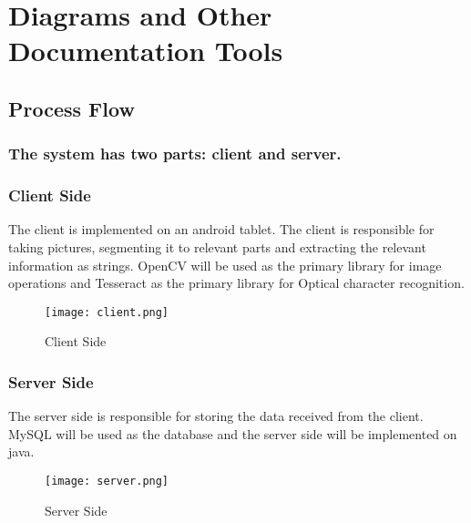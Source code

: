 %
%
%                 

\chapter{Diagrams and Other Documentation Tools}
\label{sec:appendixa}

\section{Process Flow}

\subsection*{The system has two parts: client and server.}


\subsection{Client Side}

The client is implemented on an android tablet. The client is responsible for taking pictures, segmenting it to relevant parts and extracting the relevant information as strings. OpenCV will be used as the primary library for image operations and Tesseract as the primary library for Optical character recognition.


\begin{figure}[h]                %
	\texttt{[image: client.png]}      %
	\caption{Client Side}
	\label{fig:disneystock}
\end{figure}

\pagebreak
\subsection{Server Side} 

The server side is responsible for storing the data received from the client. MySQL will be used as the database and the server side will be implemented on java. 

\begin{figure}[h]                %
	\centering                    %
	\texttt{[image: server.png]}      %
	\caption{Server Side}
	\label{fig:disneystock}
\end{figure}

